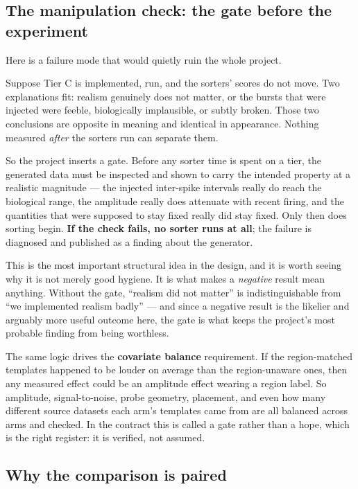 \documentclass[12pt]{article}
\begin{document}
\subsection{The manipulation check: the gate before the experiment}

Here is a failure mode that would quietly ruin the whole project.

Suppose Tier C is implemented, run, and the sorters' scores do not move. Two explanations
fit: realism genuinely does not matter, or the bursts that were injected were feeble,
biologically implausible, or subtly broken. Those two conclusions are opposite in meaning and
identical in appearance. Nothing measured \emph{after} the sorters run can separate them.

So the project inserts a gate. Before any sorter time is spent on a tier, the generated data
must be inspected and shown to carry the intended property at a realistic magnitude ---
the injected inter-spike intervals really do reach the biological range, the amplitude really
does attenuate with recent firing, and the quantities that were supposed to stay fixed really
did stay fixed. Only then does sorting begin. \textbf{If the check fails, no sorter runs at
all}; the failure is diagnosed and published as a finding about the generator.

This is the most important structural idea in the design, and it is worth seeing why it is
not merely good hygiene. It is what makes a \emph{negative} result mean anything. Without the
gate, ``realism did not matter'' is indistinguishable from ``we implemented realism badly'' ---
and since a negative result is the likelier and arguably more useful outcome here, the gate is
what keeps the project's most probable finding from being worthless.

The same logic drives the \textbf{covariate balance} requirement. If the region-matched
templates happened to be louder on average than the region-unaware ones, then any measured
effect could be an amplitude effect wearing a region label. So amplitude, signal-to-noise,
probe geometry, placement, and even how many different source datasets each arm's templates
came from are all balanced across arms and checked. In the contract this is called a gate
rather than a hope, which is the right register: it is verified, not assumed.

\subsection{Why the comparison is paired}
\end{document}
